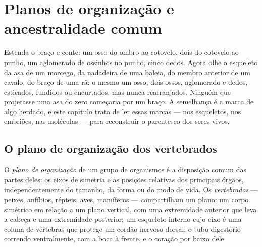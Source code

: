 \chapter{Planos de organização e ancestralidade comum}\label{ch:g10:common-ancestry}

Estenda o braço e conte: um osso do ombro ao cotovelo, dois do cotovelo
ao punho, um aglomerado de ossinhos no punho, cinco dedos. Agora olhe o
esqueleto da asa de um morcego, da nadadeira de uma baleia, do membro
anterior de um cavalo, do braço de uma rã: o mesmo um osso, dois ossos,
aglomerado e dedos, esticados, fundidos ou encurtados, mas nunca
rearranjados. Ninguém que projetasse uma asa do zero começaria por um
braço. A semelhança é a marca de algo herdado, e este capítulo trata de
ler essas marcas --- nos esqueletos, nos embriões, nas moléculas ---
para reconstruir o parentesco dos seres vivos.

\section{O plano de organização dos vertebrados}

\begin{definition}\label{def:g10:common-ancestry:bodyplan}
O \emph{plano de organização} de um grupo de
organismos é a disposição comum das partes deles: os eixos de simetria e
as posições relativas dos principais órgãos, independentemente do
tamanho, da forma ou do modo de vida. Os
\emph{vertebrados} --- peixes, anfíbios, répteis,
aves, mamíferos --- compartilham um plano: um corpo simétrico em relação
a um plano vertical, com uma extremidade anterior que leva a cabeça e
uma extremidade posterior; um esqueleto interno cujo eixo é uma coluna
de vértebras que protege um cordão nervoso dorsal; o tubo digestório
correndo ventralmente, com a boca à frente, e o coração por baixo dele.
\end{definition}

